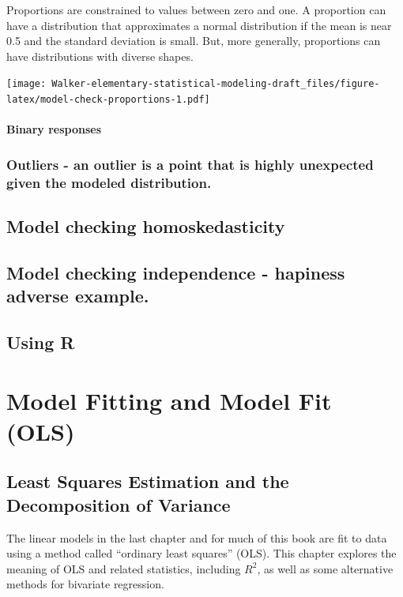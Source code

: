 \documentclass[]{book}
\begin{document}
Proportions are constrained to values between zero and one. A proportion
can have a distribution that approximates a normal distribution if the
mean is near 0.5 and the standard deviation is small. But, more
generally, proportions can have distributions with diverse shapes.

\texttt{[image: Walker-elementary-statistical-modeling-draft\_files/figure-latex/model-check-proportions-1.pdf]}

\subsubsection{Binary responses}\label{binary-responses}

\subsection{Outliers - an outlier is a point that is highly unexpected
given the modeled
distribution.}\label{outliers---an-outlier-is-a-point-that-is-highly-unexpected-given-the-modeled-distribution.}

\section{Model checking
homoskedasticity}\label{model-checking-homoskedasticity}

\section{Model checking independence - hapiness adverse
example.}\label{model-checking-independence---hapiness-adverse-example.}

\section{Using R}\label{using-r}

\chapter{Model Fitting and Model Fit
(OLS)}\label{model-fitting-and-model-fit-ols}

\section{Least Squares Estimation and the Decomposition of
Variance}\label{least-squares-estimation-and-the-decomposition-of-variance}

The linear models in the last chapter and for much of this book are fit
to data using a method called ``ordinary least squares'' (OLS). This
chapter explores the meaning of OLS and related statistics, including
\(R^2\), as well as some alternative methods for bivariate regression.
\end{document}
